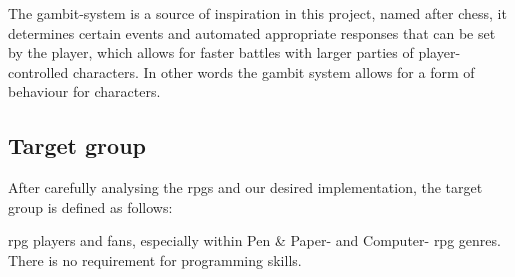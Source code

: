 The gambit-system is a source of inspiration in this project, named after chess, it determines certain events and automated appropriate responses that can be set by the player, which allows for faster battles with larger parties of player-controlled characters. In other words the gambit system allows for a form of behaviour for characters.

\subsection*{Target group}
After carefully analysing the \ac{rpgs} and our desired implementation, the target group is defined as follows:

\ac{rpg} players and fans, especially within Pen \& Paper- and Computer- \ac{rpg} genres. There is no requirement for programming skills.
\begin{comment}
\subsection{Summary}
As a proof of concept, the common characteristics have been chosen for constructing the rulebook, common characteristics being the before mentioned \emph{requirements} of the systems.
By using Characters classes, attributes, effects, abilities, resources and modifiers, a user can define a character in \langname{}, like it was a character sheet. If done correctly, this should make it easy to use for the target group.
\end{comment}
